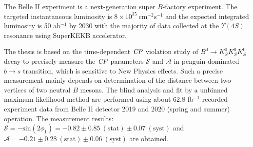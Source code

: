 % 
% 
%
The Belle II experiment is a next-generation super $B$-factory experiment. The targeted instantaneous luminosity is 
$8 \times 10^{35}~ \text{cm}^{-2}\text{s}^{-1}$ and the expected integrated luminosity is 50 ab$^{-1}$ by 2030 with the majority of data collected at the $\Upsilon(4S)$ resonance using SuperKEKB accelerator.

The thesis is based on the time-dependent $\it{CP}$ violation study of $B^0 \to K_S^0 K_S^0 K_S^0$ decay to precisely measure the $\it{CP}$ parameters $\mathcal{S}$ and $\mathcal{A}$ in penguin-dominated $b \to s$ transition, which is sensitive to New Physics effects. Such a precise measurement mainly depends on determination of the distance between two vertices of two neutral $B$ mesons. The blind analysis and fit by a unbinned maximum likelihood method are performed using about 62.8 fb$^{-1}$ recorded experiment data from Belle II detector 2019 and 2020 (spring and summer) operation. The measurement results: $\mathcal{S}= - \text{sin}(2\phi_1) = -0.82 \pm 0.85 \: (\text{stat}) \pm 0.07 \: (\text{syst})$ and $\mathcal{A}= -0.21 \pm 0.28 \: (\text{stat}) \pm 0.06 \: (\text{syst})$ are obtained.




 

